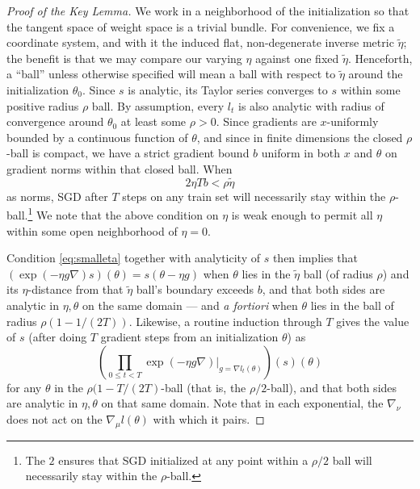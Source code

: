 \documentclass[openany, notitlepage, justified]{tufte-book}
\theoremstyle{plain}
\theoremstyle{definition}
\newcommand{\wrap}[1]{\left(#1\right)}
\begin{document}
        \begin{proof}[Proof of the Key Lemma]%
            We work in a neighborhood of the initialization so that the tangent
            space of weight space is a trivial bundle.  For convenience, we fix
            a  coordinate system, and with it the induced flat,
            non-degenerate inverse metric $\tilde\eta$; the benefit is that we
            may compare our varying $\eta$ against one fixed $\tilde\eta$.
            Henceforth, a ``ball'' unless otherwise specified will mean a ball
            with respect to $\tilde\eta$ around the initialization $\theta_0$.
            Since $s$ is analytic, its Taylor series converges to $s$ within
            some positive radius $\rho$ ball.  By assumption, every $l_t$ is
            also analytic with radius of convergence around $\theta_0$ at least
            some $\rho>0$.  Since gradients are $x$-uniformly
            bounded by a continuous function of $\theta$, and since in finite
            dimensions the closed $\rho$-ball is compact, we have a strict
            gradient bound $b$ uniform in both $x$ and $\theta$ on gradient
            norms within that closed ball.  When
            \begin{equation} \label{eq:smalleta}
                2 \eta T b < \rho \tilde\eta
            \end{equation}
            as norms, SGD after $T$ steps on any train set
            will necessarily stay within the $\rho$-ball.\footnote{
                The $2$ ensures that SGD initialized at
                any point within a $\rho/2$ ball will necessarily stay within
                the $\rho$-ball.
            } We note that the above condition on $\eta$ is weak enough to
            permit all $\eta$ within some open neighborhood of $\eta=0$.  

            Condition \ref{eq:smalleta} together with analyticity of $s$ then
            implies that
            $
                \wrap{\exp(-\eta g \nabla) s}(\theta) = s(\theta - \eta g)
            $
            when $\theta$ lies in the $\tilde\eta$ ball (of radius $\rho$) and
            its $\eta$-distance from that $\tilde\eta$ ball's boundary exceeds
            $b$, and that both sides are analytic in $\eta, \theta$ on the same
            domain --- and \emph{a fortiori} when $\theta$ lies in the ball of
            radius $\rho (1 - 1/(2T))$.  Likewise, a routine induction through
            $T$ gives the value of $s$ (after doing $T$ gradient steps from an
            initialization $\theta$) as
            $$
                \wrap{
                    \prod_{0\leq t<T}
                        \left.
                            \exp(-\eta g \nabla)
                        \right|_{g=\nabla l_t(\theta)}
                }
                (s)(\theta)
            $$
            for any $\theta$ in the $\rho (1-T/(2T)$-ball (that is, the
            $\rho/2$-ball), and that both sides are analytic in $\eta, \theta$
            on that same domain.  Note that in each exponential, the
            $\nabla_\nu$ does not act on the $\nabla_\mu l(\theta)$ with which
            it pairs.  


\end{proof}
\end{document}
